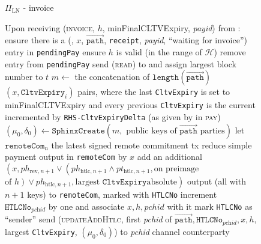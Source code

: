 \begin{figure}[H]
\begin{protocolbox}{$\Pi_{\mathrm{LN}}$ - invoice}
\begin{algorithmic}[1]
        \State Upon receiving (\textsc{invoice}, $h$, minFinalCLTVExpiry,
        \textit{payid}) from \bob:
        \Indent
          \State ensure there is a (\bob, $x$, $\overrightarrow{\mathtt{path}}$,
          \texttt{receipt}, \textit{payid}, ``waiting for invoice'') entry in
          \texttt{pendingPay}
          \State ensure $h$ is valid (in the range of $\mathcal{H}$)
          \State remove entry from \texttt{pendingPay}
          \State send (\textsc{read}) to \ledger{} and assign largest block
          number to $t$
          \State $m \gets$ the concatenation of
          $\mathtt{length}\left(\overrightarrow{\mathtt{path}}\right)$ $\left(x,
          \mathtt{CltvExpiry}_i\right)$ pairs, where the last
          \texttt{CltvExpiry} is set to minFinalCLTVExpiry and every previous
          \texttt{CltvExpiry} is the current incremented by
          \texttt{RHS-CltvExpiryDelta} (as given by \environment{} in
          \textsc{pay})
          \State $\left(\mu_0, \delta_0\right) \gets
          \mathtt{SphinxCreate}\left(m, \text{ public keys of }
          \overrightarrow{\mathtt{path}} \text{ parties}\right)$
          \State let $\mathtt{remoteCom}_n$ the latest signed remote commitment
          tx
          \State reduce simple payment output in \texttt{remoteCom} by $x$
          \State add an additional $\left(x, ph_{\mathrm{rev}, n+1} \vee
          \left(ph_{\mathrm{htlc}, n+1} \wedge pt_{\mathrm{htlc}, n+1}, \text{
          on preimage}\right.\right.$ $\left.\left.\text{of } h\right) \vee
          ph_{\mathrm{htlc}, n+1}, \text{largest } \mathtt{CltvExpiry} \text{
          absolute}\right)$ output (all with $n+1$ keys) to \texttt{remoteCom},
          marked with \texttt{HTLCNo}
          \State increment $\mathtt{HTLCNo}_{\textit{pchid}}$ by one and
          associate $x, h, \mathit{pchid}$ with it
          \State mark \texttt{HTLCNo} as ``sender''
          \State send (\textsc{updateAddHtlc}, first \textit{pchid} of
          $\overrightarrow{\mathtt{path}}, \mathtt{HTLCNo}_{\textit{pchid}}, x,
          h,$ largest \texttt{CltvExpiry}, $\left(\mu_0,
          \delta_0\right)$) to \textit{pchid} channel counterparty
        \EndIndent
      \end{algorithmic}
    \end{protocolbox}
    \caption{}
    \label{alg:protocol:pay:invoice}
  \end{figure}

